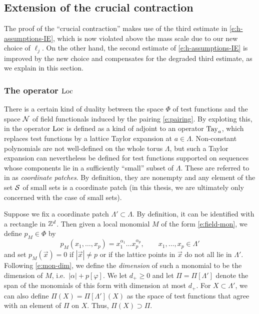 
\subsection{Extension of the crucial contraction}
\label{sec:cc}

The proof of the ``crucial contraction''
\cite[Proposition \ref{IE-prop:cl}]{BS-rg-IE}
makes use of the  third estimate in
\eqref{e:h-assumptions-IE}, which is now violated above the mass scale
due to our new choice of $\ell_j$.
On the other hand, the second estimate of \eqref{e:h-assumptions-IE} is
improved by the new choice and compensates for the degraded third estimate,
as we explain in this section.

\subsubsection{The operator $\operatorname{Loc}$}

There is a certain kind of duality between the space $\Phi$ of test functions
and the space $\mathcal{N}$ of field functionals induced by the pairing \eqref{e:pairing}.
By exploting this,
in \cite{BS-rg-IE} the operator $\operatorname{Loc}$ is defined as a kind of adjoint to
an operator ${\rm Tay}_a$, which replaces test functions by a lattice Taylor expansion
at $a\in\Lambda$.
Non-constant polynomials are not well-defined on the whole torus $\Lambda$, but
such a Taylor expansion can nevertheless be defined for test functions supported
on sequences whose components lie in a sufficiently ``small'' subset of $\Lambda$.
These are referred to in \cite{BS-rg-IE} as \emph{coordinate patches}. By definition,
they are nonempty and any element of the set $\mathcal{S}$ of small sets is a coordinate
patch (in this thesis, we are ultimately only concerned with the case of small sets).

Suppose we fix a coordinate patch $\Lambda' \subset \Lambda$. By definition, it
can be identified with a rectangle in ${ {{\mathbb Z}}^d }$.
Then given a local monomial $M$ of the form \eqref{e:field-mon},
we define $p_M\in\Phi$ by
\begin{equation}
\label{e:lattice-mon}
p_M(x_1, \ldots, x_p)
	=
x_1^{\alpha_1} \ldots x_p^{\alpha_p},
	\qquad
x_1, \ldots, x_p \in \Lambda'
\end{equation}
and set $p_M(\vec x) = 0$ if $|\vec x| \ne p$ or if the lattice points in $\vec x$
do not all lie in $\Lambda'$. Following \eqref{e:mon-dim},
we define the \emph{dimension} of such a monomial to be the dimension of $M$,
i.e.\ $|\alpha| + p [\varphi]$.
We let $d_+ \ge 0$ and let $\Pi = \Pi[\Lambda']$ denote the span of the monomials
of this form with dimension at most $d_+$. For $X \subset \Lambda'$, we can also define
$\Pi(X) = \Pi[\Lambda'](X)$ as the space of test functions that agree with an element
of $\Pi$ on $X$. Thus, $\Pi(X) \supset \Pi$.

